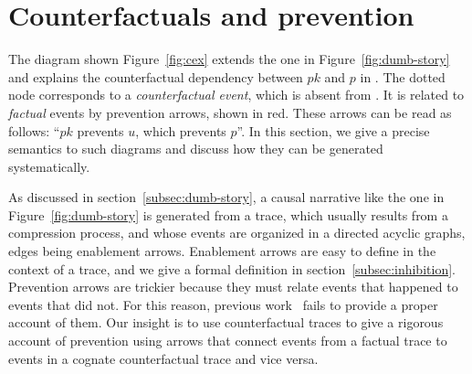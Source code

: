 
\section{Counterfactuals and prevention}\label{sec:inhibition}




The diagram shown Figure~\ref{fig:cex} extends the one in
Figure~\ref{fig:dumb-story} and explains the counterfactual dependency
between $pk$ and $p$ in \RefTrace{}. The dotted node corresponds to a
\emph{counterfactual event}, which is absent from \RefTrace{}. It is
related to \emph{factual} events by prevention arrows, shown in
red. These arrows can be read as follows: ``$pk$ prevents $u$, which
prevents $p$''. In this section, we give a precise semantics to such
diagrams and discuss how they can be generated systematically.

As discussed in section~\ref{subsec:dumb-story}, a causal narrative
like the one in Figure~\ref{fig:dumb-story} is generated from a trace,
which usually results from a compression process, and whose events are
organized in a directed acyclic graphs, edges being enablement arrows.
Enablement arrows are easy to define in the context of a trace, and we
give a formal definition in section~\ref{subsec:inhibition}.
Prevention arrows are trickier because they must relate events that
happened to events that did not. For this reason, previous
work~\cite{DanosEtAl-CONCUR07,DBLP:conf/fsttcs/DanosFFHH12} fails to
provide a proper account of them.  Our insight is to use
counterfactual traces to give a rigorous account of prevention using
arrows that connect events from a factual trace to events in a
cognate counterfactual trace and vice versa.


